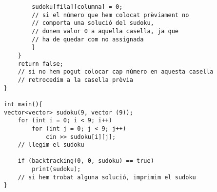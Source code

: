 \begin{lstlisting}
        sudoku[fila][columna] = 0;
        // si el número que hem colocat prèviament no
        // comporta una solució del sudoku,
        // donem valor 0 a aquella casella, ja que
        // ha de quedar com no assignada
        }
    }
    return false;
    // si no hem pogut colocar cap número en aquesta casella
    // retrocedim a la casella prèvia
}

int main(){
vector<vector> sudoku(9, vector (9));
    for (int i = 0; i < 9; i++)
        for (int j = 0; j < 9; j++)
            cin >> sudoku[i][j];
    // llegim el sudoku
    
    if (backtracking(0, 0, sudoku) == true)
        print(sudoku);
    // si hem trobat alguna solució, imprimim el sudoku
}
\end{lstlisting}

